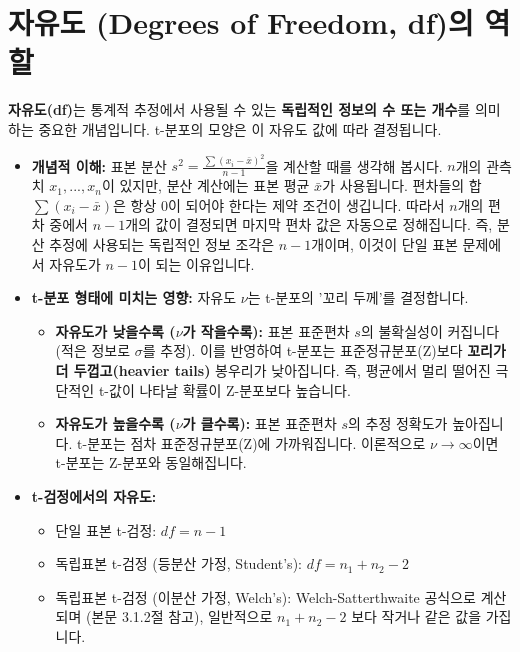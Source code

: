 \documentclass[
  letterpaper,
]{book}
\providecommand{\tightlist}{%
  \setlength{\itemsep}{0pt}\setlength{\parskip}{0pt}}
\begin{document}
\chapter{자유도 (Degrees of Freedom, df)의
역할}\label{uxc790uxc720uxb3c4-degrees-of-freedom-dfuxc758-uxc5eduxd560}

\textbf{자유도(df)}는 통계적 추정에서 사용될 수 있는 \textbf{독립적인
정보의 수 또는 개수}를 의미하는 중요한 개념입니다. t-분포의 모양은 이
자유도 값에 따라 결정됩니다.

\begin{itemize}
\tightlist
\item
  \textbf{개념적 이해:} 표본 분산
  \(s^2 = \frac{\sum(x_i - \bar{x})^2}{n-1}\)을 계산할 때를 생각해
  봅시다. \(n\)개의 관측치 \(x_1, ..., x_n\)이 있지만, 분산 계산에는
  표본 평균 \(\bar{x}\)가 사용됩니다. 편차들의 합
  \(\sum(x_i - \bar{x})\)은 항상 0이 되어야 한다는 제약 조건이 생깁니다.
  따라서 \(n\)개의 편차 중에서 \(n-1\)개의 값이 결정되면 마지막 편차
  값은 자동으로 정해집니다. 즉, 분산 추정에 사용되는 독립적인 정보
  조각은 \(n-1\)개이며, 이것이 단일 표본 문제에서 자유도가 \(n-1\)이
  되는 이유입니다.
\item
  \textbf{t-분포 형태에 미치는 영향:} 자유도 \(\nu\)는 t-분포의 '꼬리
  두께'를 결정합니다.

  \begin{itemize}
  \tightlist
  \item
    \textbf{자유도가 낮을수록 (\(\nu\)가 작을수록):} 표본 표준편차
    \(s\)의 불확실성이 커집니다 (적은 정보로 \(\sigma\)를 추정). 이를
    반영하여 t-분포는 표준정규분포(Z)보다 \textbf{꼬리가 더
    두껍고(heavier tails)} 봉우리가 낮아집니다. 즉, 평균에서 멀리 떨어진
    극단적인 t-값이 나타날 확률이 Z-분포보다 높습니다.
  \item
    \textbf{자유도가 높을수록 (\(\nu\)가 클수록):} 표본 표준편차 \(s\)의
    추정 정확도가 높아집니다. t-분포는 점차 표준정규분포(Z)에
    가까워집니다. 이론적으로 \(\nu \to \infty\)이면 t-분포는 Z-분포와
    동일해집니다.
  \end{itemize}
\item
  \textbf{t-검정에서의 자유도:}

  \begin{itemize}
  \tightlist
  \item
    단일 표본 t-검정: \(df = n - 1\)
  \item
    독립표본 t-검정 (등분산 가정, Student's): \(df = n_1 + n_2 - 2\)
  \item
    독립표본 t-검정 (이분산 가정, Welch's): Welch-Satterthwaite 공식으로
    계산되며 (본문 3.1.2절 참고), 일반적으로 \(n_1+n_2-2\) 보다 작거나
    같은 값을 가집니다.
  \end{itemize}
\end{itemize}
\end{document}
